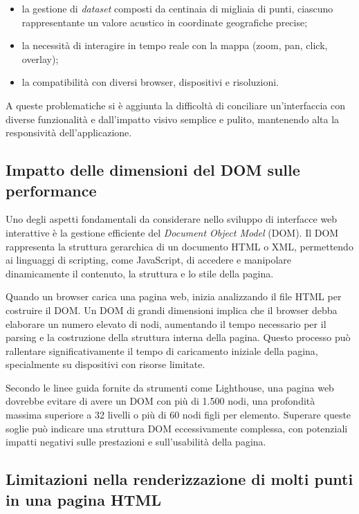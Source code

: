 \begin{itemize}
  \item la gestione di \textit{dataset} composti da centinaia di migliaia di punti, ciascuno rappresentante un valore acustico in coordinate geografiche precise;
  \item la necessità di interagire in tempo reale con la mappa (zoom, pan, click, overlay);
  \item la compatibilità con diversi browser, dispositivi e risoluzioni.
\end{itemize}

A queste problematiche si è aggiunta la difficoltà di conciliare un'interfaccia con diverse funzionalità e dall'impatto visivo semplice e pulito, mantenendo alta la responsività dell'applicazione.

\subsection{Impatto delle dimensioni del DOM sulle performance}

Uno degli aspetti fondamentali da considerare nello sviluppo di interfacce web interattive è la gestione efficiente del \textit{Document Object Model} (DOM). Il DOM rappresenta la struttura gerarchica di un documento HTML o XML, permettendo ai linguaggi di scripting, come JavaScript, di accedere e manipolare dinamicamente il contenuto, la struttura e lo stile della pagina.

Quando un browser carica una pagina web, inizia analizzando il file HTML per costruire il DOM. Un DOM di grandi dimensioni implica che il browser debba elaborare un numero elevato di nodi, aumentando il tempo necessario per il parsing e la costruzione della struttura interna della pagina. Questo processo può rallentare significativamente il tempo di caricamento iniziale della pagina, specialmente su dispositivi con risorse limitate.

Secondo le linee guida fornite da strumenti come Lighthouse, una pagina web dovrebbe evitare di avere un DOM con più di 1.500 nodi, una profondità massima superiore a 32 livelli o più di 60 nodi figli per elemento. Superare queste soglie può indicare una struttura DOM eccessivamente complessa, con potenziali impatti negativi sulle prestazioni e sull'usabilità della pagina. \cite{chrome-dom-size}

\subsection{Limitazioni nella renderizzazione di molti punti in una pagina HTML}

